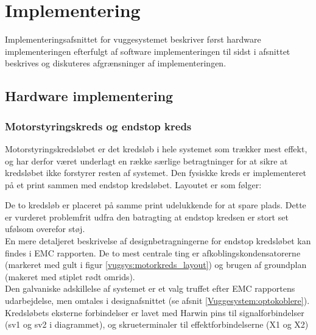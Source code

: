 \section{Implementering}
\label{Vuggesystem: Implementering} 
Implementeringsafsnittet for vuggesystemet beskriver først hardware implementeringen efterfulgt af software implementeringen til sidst i afsnittet beskrives og diskuteres afgrænsninger af implementeringen.
\subsection{Hardware implementering}
\subsubsection{Motorstyringskreds og endstop kreds}
Motorstyringskredsløbet er det kredsløb i hele systemet som trækker mest effekt, og har derfor været underlagt en række særlige betragtninger for at sikre at kredsløbet ikke forstyrer resten af systemet. Den fysiskke kreds er implementeret på et print sammen med endstop kredsløbet. Layoutet er som følger:


De to kredsløb er placeret på samme print udelukkende for at spare plads. Dette er vurderet problemfrit udfra den batragting at endstop kredsen er stort set ufølsom overefor støj.\\

En mere detaljeret beskrivelse af designbetragningerne for endstop kredsløbet kan findes i EMC rapporten. De to mest centrale ting er afkoblingskondensatorerne (markeret med gult i figur \ref{vugsys:motorkreds_layout}) og brugen af groundplan (makeret med stiplet rødt omrids). \\

Den galvaniske adskillelse af systemet er et valg truffet efter EMC rapportens udarbejdelse, men omtales i designafsnittet (se afsnit \vref{Vuggesystem:optokoblere}).\\

Kredsløbets eksterne forbindelser er lavet med Harwin pins til signalforbindelser (sv1 og sv2 i diagrammet), og skrueterminaler til effektforbindelserne (X1 og X2)

\newpage
